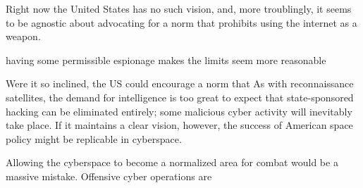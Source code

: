 \documentclass[11pt]{memoir}
\begin{document}
Right now the United States has no such vision, and, more troublingly, it seems to be agnostic about advocating for a norm that prohibits using the internet as a weapon.




having some permissible espionage makes the limits seem more reasonable




Were it so inclined, the US could encourage a norm that  As with reconnaissance satellites, the demand for intelligence is too great to expect that state-sponsored hacking can be eliminated entirely; some malicious cyber activity will inevitably take place. If it maintains a clear vision, however, the success of American space policy might be replicable in cyberspace.

Allowing the cyberspace to become a normalized area for combat would be a massive mistake. Offensive cyber operations are






\end{document}
